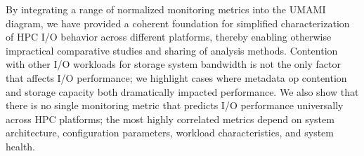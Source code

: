 By integrating a range of normalized monitoring metrics into the UMAMI diagram, we have provided a coherent foundation for simplified characterization of HPC I/O behavior across different platforms, thereby enabling otherwise impractical comparative studies and sharing of analysis methods. 
Contention with other I/O workloads for storage system bandwidth is not the only factor that affects I/O performance;
we highlight cases where metadata op contention and storage capacity both dramatically impacted performance.
We also show that there is no single monitoring metric that predicts I/O performance universally across HPC platforms;
the most highly correlated metrics depend on system architecture, configuration parameters, workload characteristics, and system health.




